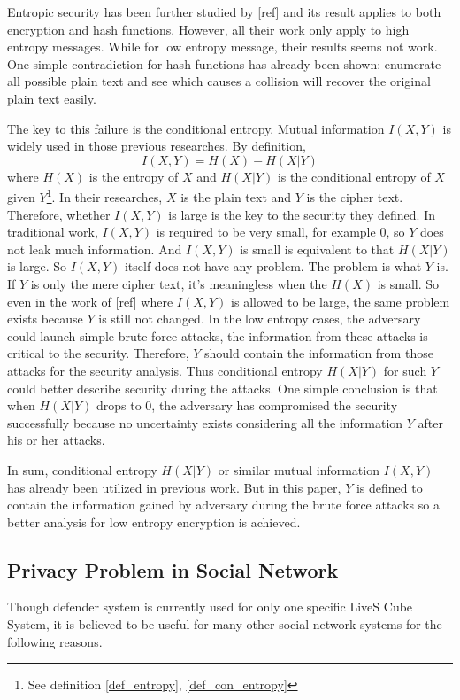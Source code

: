 \documentclass[10pt,a4paper]{article}
\begin{document}
	Entropic security has been further studied by [ref]
	and its result applies to both encryption and hash functions.
	However, all their work only apply to high entropy messages.
	While for low entropy message, their results seems not work.
	One simple contradiction for hash functions has already been
	shown: enumerate all possible plain text and see which causes a collision
	will recover the original plain text easily.
	
	The key to this failure is the conditional entropy. Mutual information
	$I(X, Y)$ is widely used in those previous researches. By definition,
	\begin{equation}
		I(X, Y) = H(X) - H(X|Y)
	\end{equation}
	where $H(X)$ is the entropy of $X$ and $H(X|Y)$ is the conditional entropy
	of $X$ given $Y$\footnote{See definition \ref{def_entropy}, \ref{def_con_entropy}}.
	In their researches, $X$ is the plain text and $Y$ is the cipher text.
	Therefore, whether $I(X, Y)$ is large is the key to the security they defined.
	In traditional work, $I(X, Y)$ is required to be very small, for example $0$,
	so $Y$ does not leak much information. And $I(X, Y)$ is small
	is equivalent to that $H(X|Y)$ is large. So $I(X, Y)$ itself does not have any problem.
	The problem is what $Y$ is.
	If $Y$ is only the mere cipher text, it's meaningless when the $H(X)$ is small.
	So even in the work of [ref] where $I(X, Y)$ is allowed
	to be large, the same problem exists because $Y$ is still not changed.
	In the low entropy cases, the adversary could launch simple brute force attacks,
	the information from these attacks is critical to the security. Therefore, $Y$
	should contain the information from those attacks for the security analysis.
	Thus conditional entropy $H(X|Y)$ for such $Y$ could better describe security during
	the attacks. One simple conclusion is that when $H(X|Y)$ drops to $0$, the adversary
	has compromised the security successfully because no uncertainty exists considering 
	all the information $Y$ after his or her attacks.
	
	In sum, conditional entropy $H(X|Y)$ or similar mutual information $I(X, Y)$
	has already been utilized in previous work. But in this paper, $Y$ is defined to contain the information
	gained by adversary during the brute force attacks so a better analysis
	for low entropy encryption is achieved.
	
	\subsection{Privacy Problem in Social Network}		
	Though defender system is currently used for only one specific LiveS Cube System,
	it is believed to be useful for many other social network
	systems for the following reasons. 
	
\end{document}
